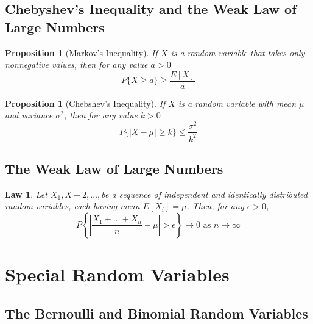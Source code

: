 \documentclass[12pt]{article}
\newtheorem{law}[theorem]{Law}
\newtheorem{proposition}[theorem]{Proposition}
\begin{document}
\subsection{Chebyshev's Inequality and the Weak Law of Large Numbers}

\begin{proposition} [Markov's Inequality]
  If $X$ is a random variable that takes only nonnegative values, then for any value $a>0$
  \begin{equation*}
    P\{ X \ge a \} \ge \frac {E[X]}{a}
  \end{equation*}
\end{proposition}

\begin{proposition} [Chebshev's Inequality]
  If $X$ is a random variable with mean $\mu$ and variance $\sigma^2$, then for any value $k>0$
  \begin{equation*}
    P\{ |X-\mu| \ge k \} \le \frac {\sigma^2}{k^2}
  \end{equation*}
\end{proposition}

\subsection{The Weak Law of Large Numbers}

\begin{law}
  Let $X_1, X-2,\dots,$be a sequence of independent and identically distributed random variables, each having mean $E[X_i] = \mu$. Then, for any $\epsilon > 0$,
  \begin{equation*}
    P \left\{ \left|\frac{X_1 + \dots + X_n}{n} - \mu \right| 
        > \epsilon \right\} \rightarrow 0 \text{  as } n \rightarrow \infty
  \end{equation*}
\end{law}

\section{Special Random Variables}

\subsection{The Bernoulli and Binomial Random Variables}
\end{document}
